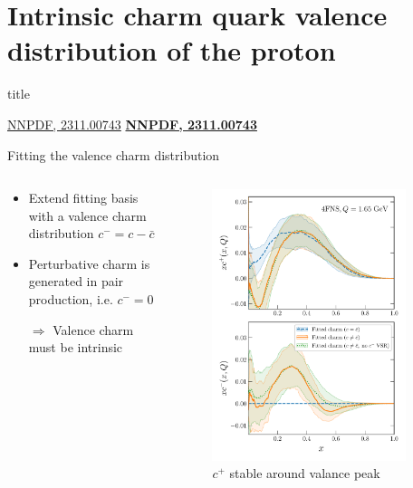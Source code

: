 \documentclass[aspectratio=43, 8pt,t]{beamer}
\newcommand{\SectionTitleFrame}[1][]{%
  \begin{frame}
    \vfill
    \centering
    \begin{beamercolorbox}[sep=8pt,center,shadow=true,rounded=true]{title}
      \usebeamerfont{title}\insertsection\par
    \end{beamercolorbox}
    \ifx\relax#1\relax\else
      \vspace{0.5cm}
      \textbf{#1}
    \fi
    \vfill
  \end{frame}
}
\begin{document}
\section*{Intrinsic charm quark valence distribution of the proton}
\SectionTitleFrame[\hyperlink{https://arxiv.org/abs/2311.00743}{NNPDF, 2311.00743}]


\begin{frame}{Fitting the valence charm distribution}
  \begin{columns}
    \begin{column}{0.49\columnwidth}
      \begin{itemize}
        \item Extend fitting basis with a valence charm distribution $c^-=c-\bar{c}$
        \item Perturbative charm is generated in pair production, i.e. $c^-=0$
        \item[$\Rightarrow$] Valence charm must be intrinsic
      \end{itemize}
    \end{column}
    \begin{column}{0.49\columnwidth}
      \vspace*{-2em}
      \begin{figure}
        \includegraphics[width=0.9\textwidth]{CharmAsymmetry-q1p65gev-Fig1Main-noVSR.pdf}
        \caption*{$c^+$ stable around valance peak}
      \end{figure}
    \end{column}
  \end{columns}
\end{frame}
\end{document}
